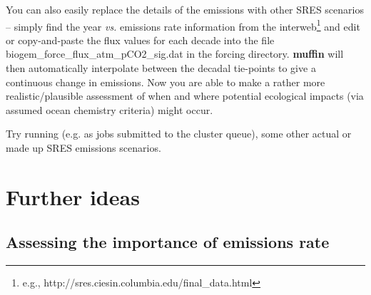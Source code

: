 \documentclass[11pt,fleqn]{book} %
\begin{document}
You can also easily replace the details of the emissions with other SRES scenarios – simply find the year \textit{vs.} emissions rate information from the interweb\footnote{e.g., http://sres.ciesin.columbia.edu/final\_data.html} and edit or copy-and-paste the flux values for each decade into the file \footnotesize\textsf{biogem\_force\_flux\_atm\_pCO2\_sig.dat }\normalsize in the forcing directory.\textbf{ muffin} will then automatically interpolate between the decadal tie-points to give a continuous change in emissions. Now you are able to make a rather more realistic/plausible assessment of when and where potential ecological impacts (via assumed ocean chemistry criteria) might occur.

Try running (e.g. as jobs submitted to the cluster queue), some other actual or made up SRES emissions scenarios.


\newpage


\section{Further ideas}


\subsection{Assessing the importance of emissions rate}
\end{document}
